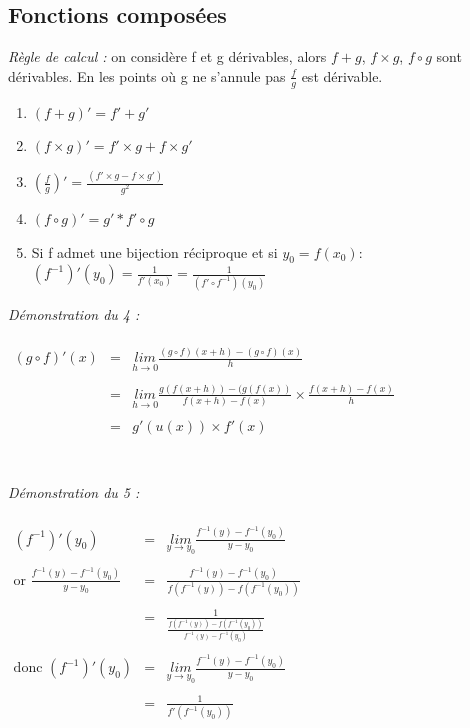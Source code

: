 \documentclass[a4paper,10pt]{book}
\begin{document}
\subsection{Fonctions composées}
\label{Formules de dérivation}
\emph{Règle de calcul :} on considère f et g dérivables, alors $f+g$, $f \times g$, $f\circ g$ sont dérivables. En les points où g ne s'annule pas $\frac{f}{g}$ est dérivable.
\begin{enumerate}
\item $(f+g)'=f'+g'$
\item $(f\times g)'=f'\times g+f\times g'$
\item $(\frac{f}{g})'=\frac{(f'\times g-f\times g')}{g^{2}}$
\item $(f\circ g)'=g'*f'\circ g$
\item Si f admet une bijection réciproque et si $y_{0}=f(x_{0})$:\\
$(f^{-1})'(y_{0})=\frac{1}{f'(x_{0})}=\frac{1}{(f'\circ f^{-1})(y_{0})}$ \\
\end{enumerate}
\emph{Démonstration du 4 :}\\ \\
$\begin{array}{rcl}
(g\circ f)'(x)&=&\underset{h \rightarrow 0}{lim} \frac{(g\circ f)(x+h)-(g\circ f)(x)}{h}\\\\
&=&\underset{h \rightarrow 0}{lim} \frac{g(f(x+h))-(g(f(x))}{f(x+h)-f(x)}\times \frac{f(x+h)-f(x)}{h}\\\\
&=&g'(u(x))\times f'(x)\\
\end{array}$\\ \\ \\
\emph{Démonstration du 5 :}\\ \\
$\begin{array}{rcl}
(f^{-1})'(y_{0})&=&\underset{y \rightarrow y_{0}}{lim} \frac{f^{-1}(y)-f^{-1}(y_{0})}{y-y_{0}}\\\\
\text{or } \frac{f^{-1}(y)-f^{-1}(y_{0})}{y-y_{0}}&=&\frac{f^{-1}(y)-f^{-1}(y_{0})}{f(f^{-1}(y))-f(f^{-1}(y_{0}))}\\\\
&=&\frac{1}{\frac{f(f^{-1}(y))-f(f^{-1}(y_{0}))}{f^{-1}(y)-f^{-1}(y_{0})}}\\\\
\text{donc } (f^{-1})'(y_{0})&=&\underset{y \rightarrow y_{0}}{lim} \frac{f^{-1}(y)-f^{-1}(y_{0})}{y-y_{0}}\\\\
&=&\frac{1}{f'(f^{-1}(y_{0}))}\\\\\\
\end{array}$
\end{document}

